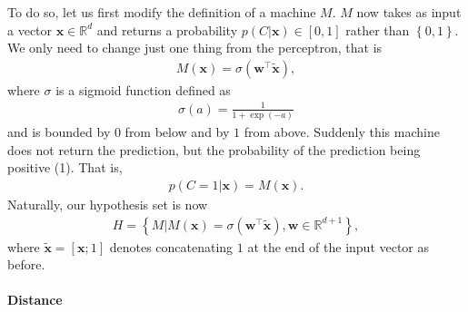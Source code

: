 \documentclass{report}
\newcommand{\vect}[1]{\mathbf{#1}}
\newcommand{\vx}[0]{\vect{x}}
\newcommand{\vw}[0]{\vect{w}}
\newcommand{\sigmoid}{\sigma}
\begin{document}
To do so, let us first modify the definition of a machine $M$. $M$ now takes as
input a vector $\vx \in \mathbb{R}^d$ and returns a probability $p(C|\vx) \in
\left[ 0, 1\right]$ rather than $\left\{ 0, 1\right\}$. We only need to change
just one thing from the perceptron, that is
\begin{align}
    \label{eq:logreg}
    M(\vx) = \sigmoid(\vw^\top \tilde{\vx}),
\end{align}
where $\sigmoid$ is a sigmoid function defined as
\begin{align*}
    \sigmoid(a) = \frac{1}{1 + \exp(-a)}
\end{align*}
and is bounded by $0$ from below and by $1$ from above. Suddenly this machine
does not return the prediction, but the probability of the prediction being
positive (1). That is,
\begin{align*}
    p(C=1|\vx) = M(\vx).
\end{align*}
Naturally, our hypothesis set is now
\begin{align*}
    H = \left\{ 
    M | M(\vx) = \sigmoid(\vw^\top \tilde{\vx}), \vw \in \mathbb{R}^{d+1}
    \right\},
\end{align*}
where $\tilde{\vx} = \left[ \vx; 1\right]$ denotes concatenating $1$ at the end
of the input vector as before. 

\paragraph{Distance}
\end{document}
